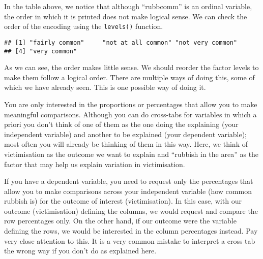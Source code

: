 \documentclass[
]{book}
\newenvironment{Shaded}{\begin{snugshade}}{\end{snugshade}}
\newcommand{\AttributeTok}[1]{\textcolor[rgb]{0.13,0.29,0.53}{#1}}
\newcommand{\FunctionTok}[1]{\textcolor[rgb]{0.13,0.29,0.53}{\textbf{#1}}}
\newcommand{\NormalTok}[1]{#1}
\newcommand{\OtherTok}[1]{\textcolor[rgb]{0.56,0.35,0.01}{#1}}
\newcommand{\SpecialCharTok}[1]{\textcolor[rgb]{0.81,0.36,0.00}{\textbf{#1}}}
\newcommand{\StringTok}[1]{\textcolor[rgb]{0.31,0.60,0.02}{#1}}
\begin{document}
In the table above, we notice that although ``rubbcomm'' is an ordinal variable, the order in which it is printed does not make logical sense. We can check the order of the encoding using the \texttt{levels()} function.

\begin{Shaded}
\end{Shaded}

\begin{verbatim}
## [1] "fairly common"     "not at all common" "not very common"  
## [4] "very common"
\end{verbatim}

As we can see, the order makes little sense. We should reorder the factor levels to make them follow a logical order. There are multiple ways of doing this, some of which we have already seen. This is one possible way of doing it.

\begin{Shaded}
\end{Shaded}

You are only interested in the proportions or percentages that allow you to make meaningful comparisons. Although you can do cross-tabs for variables in which a priori you don't think of one of them as the one doing the explaining (your independent variable) and another to be explained (your dependent variable); most often you will already be thinking of them in this way. Here, we think of victimisation as the outcome we want to explain and ``rubbish in the area'' as the factor that may help us explain variation in victimisation.

If you have a dependent variable, you need to request only the percentages that allow you to make comparisons across your independent variable (how common rubbish is) for the outcome of interest (victimisation). In this case, with our outcome (victimisation) defining the columns, we would request and compare the row percentages only. On the other hand, if our outcome were the variable defining the rows, we would be interested in the column percentages instead. Pay very close attention to this. It is a very common mistake to interpret a cross tab the wrong way if you don't do as explained here.
\end{document}
